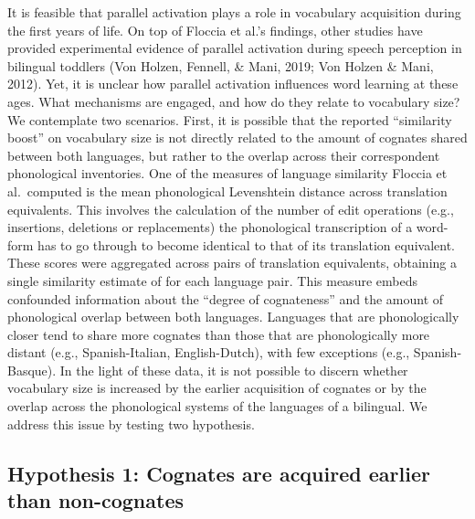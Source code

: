 \documentclass[
  english,
  man,man,floatsintext]{apa6}
\begin{document}
It is feasible that parallel activation plays a role in vocabulary acquisition during the first years of life. On top of Floccia et al.'s findings, other studies have provided experimental evidence of parallel activation during speech perception in bilingual toddlers (Von Holzen, Fennell, \& Mani, 2019; Von Holzen \& Mani, 2012). Yet, it is unclear how parallel activation influences word learning at these ages. What mechanisms are engaged, and how do they relate to vocabulary size? We contemplate two scenarios. First, it is possible that the reported \enquote{similarity boost} on vocabulary size is not directly related to the amount of cognates shared between both languages, but rather to the overlap across their correspondent phonological inventories. One of the measures of language similarity Floccia et al.~computed is the mean phonological Levenshtein distance across translation equivalents. This involves the calculation of the number of edit operations (e.g., insertions, deletions or replacements) the phonological transcription of a word-form has to go through to become identical to that of its translation equivalent. These scores were aggregated across pairs of translation equivalents, obtaining a single similarity estimate of for each language pair. This measure embeds confounded information about the \enquote{degree of cognateness} and the amount of phonological overlap between both languages. Languages that are phonologically closer tend to share more cognates than those that are phonologically more distant (e.g., Spanish-Italian, English-Dutch), with few exceptions (e.g., Spanish-Basque). In the light of these data, it is not possible to discern whether vocabulary size is increased by the earlier acquisition of cognates or by the overlap across the phonological systems of the languages of a bilingual. We address this issue by testing two hypothesis.

\hypertarget{hypothesis-1-cognates-are-acquired-earlier-than-non-cognates}{%
\subsection{Hypothesis 1: Cognates are acquired earlier than non-cognates}\label{hypothesis-1-cognates-are-acquired-earlier-than-non-cognates}}
\end{document}
